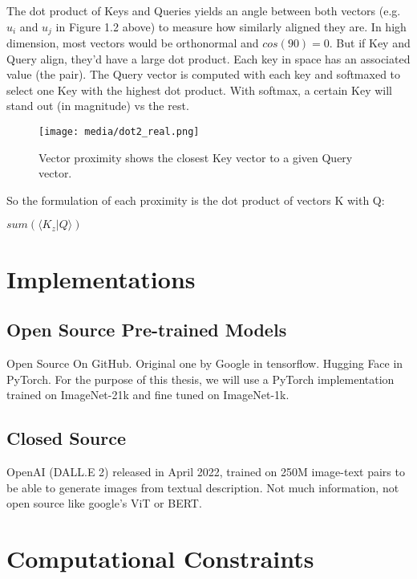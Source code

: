 The dot product of Keys and Queries yields an angle between both vectors (e.g. $u_i$ and $u_j$ in Figure 1.2 above) to measure 
how similarly aligned they are. In high dimension, most vectors would be orthonormal 
and $cos(90)=0$. But if Key and Query align, they'd have a large dot product. 
Each key in space has an associated value (the pair). The Query vector is computed with 
each key and softmaxed to select one Key with the highest dot product. With softmax, 
a certain Key will stand out (in magnitude) vs the rest.

\begin{figure}[H]
	\begin{center}
	\texttt{[image: media/dot2\_real.png]}
	\end{center}
	\caption[Key/Query Vector Proximity]{Vector proximity shows the closest Key vector to a given Query vector.}
	\end{figure}

So the formulation of each proximity is the dot product of vectors K with Q:
\begin{center}
	$ \displaystyle sum(\langle K_z \vert Q \rangle) $
	\end{center}




\newpage

\section{Implementations}
\subsection{Open Source Pre-trained Models}

Open Source
On GitHub.
Original one by Google in tensorflow.
Hugging Face in PyTorch.
For the purpose of this thesis, we will use a PyTorch implementation trained on ImageNet-21k
and fine tuned on ImageNet-1k.

\subsection{Closed Source}

OpenAI (DALL.E 2) released in April 2022, trained on 250M image-text pairs 
to be able to generate images from textual description. \citep{Dalle2}
Not much information, not open source like google's ViT or BERT.

\section{Computational Constraints}

